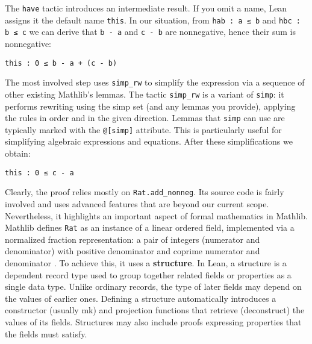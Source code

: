 The \lstinline[language=lean]|have| tactic introduces an intermediate result. If you omit a name, Lean assigns it the default name \lstinline[language=lean]|this|. In our situation, from \lstinline[language=lean]|hab : a ≤ b| and \lstinline[language=lean]|hbc : b ≤ c| we can derive that \lstinline[language=lean]|b - a| and \lstinline[language=lean]|c - b| are nonnegative, hence their sum is nonnegative:
\begin{lstlisting}[language=lean]
this : 0 ≤ b - a + (c - b)
\end{lstlisting}
The most involved step uses \lstinline[language=lean]|simp_rw| to 
simplify the expression via a sequence of other existing Mathlib's lemmas. 
The tactic \lstinline[language=lean]|simp_rw| is a variant of \lstinline[language=lean]|simp|: it performs rewriting using the simp set (and any lemmas you provide), applying the rules in order and in the given direction. Lemmas that \lstinline[language=lean]|simp| can use are typically marked with the \lstinline[language=lean]|@[simp]| attribute. This is particularly useful for simplifying algebraic expressions and equations.
After these simplifications we obtain:
\begin{lstlisting}[language=lean]
this : 0 ≤ c - a
\end{lstlisting}
Clearly, the proof relies mostly on \lstinline[language=lean]|Rat.add_nonneg|. 
Its source code is fairly involved and uses advanced features 
that are beyond our current scope. Nevertheless, it highlights 
an important aspect of formal mathematics in Mathlib.
Mathlib defines \lstinline[language=lean]|Rat| as an instance of 
a linear ordered field, implemented via a normalized fraction 
representation: a pair of integers (numerator and denominator) 
with positive denominator and coprime numerator and denominator \cite{mathlibdoc}. 
To achieve this, it uses a \textbf{structure}. In Lean, a structure is a dependent record type 
used to group together related fields or properties as a single data type.
Unlike ordinary records, the type of later fields may depend on the values of earlier ones.
Defining a structure automatically introduces a constructor (usually mk) and projection 
functions that retrieve (deconstruct) the values of its fields.
Structures may also include proofs expressing properties that the fields must satisfy.

